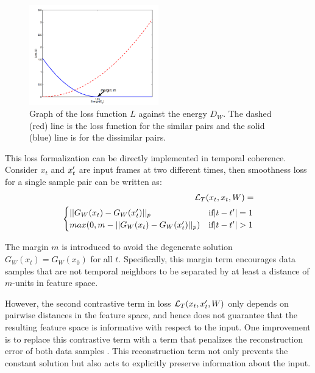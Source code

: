\begin{figure}
\centering
\includegraphics[width=0.5\textwidth]{images/twoloss.png}
\caption{Graph of the loss function $L$ against the energy $D_W$. The dashed (red) line is the loss function for the similar pairs and the solid (blue) line is for the dissimilar pairs.}
\label{fig:twoloss}
\end{figure}

This loss formalization can be directly implemented in temporal coherence. Consider $x_t$ and $x_t\rq{}$ are input frames at two different times, then smoothness loss for a single sample pair can be written as:
\begin{equation}
\begin{split}
\lagr_T(x_t, x_t, W) = \\
     \begin{cases}
        ||G_W(x_t) - G_W(x_t\rq{})||_p & \text{if} |t-t\rq{}| = 1\\
        max(0, m - ||G_W(x_t) - G_W(x_t\rq{})||_p) &\text{if} |t-t\rq{}| > 1 \\
    \end{cases}
\end{split}
\end{equation}

The margin $m$ is introduced to avoid the degenerate solution $G_W(x_t) = G_W(x_0)$ for all $t$. 
Specifically, this margin term encourages data samples that are not temporal neighbors to be separated by at least a distance of $m$-units in feature space. 

However, the second contrastive term in loss $\lagr_T(x_t, x_t\rq{}, W)$ only depends on pairwise distances in the feature space, and hence does not guarantee that the resulting feature space is informative with respect to the input. 
One improvement is to replace this contrastive term with a term that penalizes the reconstruction error of both data samples \cite{goroshin2015unsupervised}. 
This reconstruction term not only prevents the constant solution but also acts to explicitly preserve information about the input.

